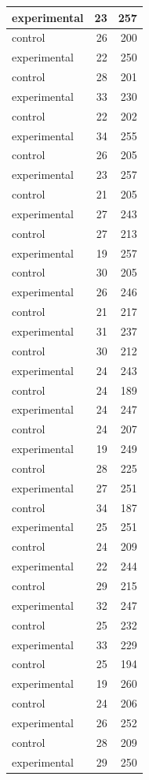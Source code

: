 \documentclass[]{svmono}
\begin{document}
\begin{tabular}{l|r|r}
\hline
experimental & 23 & 257\\
\hline
control & 26 & 200\\
\hline
experimental & 22 & 250\\
\hline
control & 28 & 201\\
\hline
experimental & 33 & 230\\
\hline
control & 22 & 202\\
\hline
experimental & 34 & 255\\
\hline
control & 26 & 205\\
\hline
experimental & 23 & 257\\
\hline
control & 21 & 205\\
\hline
experimental & 27 & 243\\
\hline
control & 27 & 213\\
\hline
experimental & 19 & 257\\
\hline
control & 30 & 205\\
\hline
experimental & 26 & 246\\
\hline
control & 21 & 217\\
\hline
experimental & 31 & 237\\
\hline
control & 30 & 212\\
\hline
experimental & 24 & 243\\
\hline
control & 24 & 189\\
\hline
experimental & 24 & 247\\
\hline
control & 24 & 207\\
\hline
experimental & 19 & 249\\
\hline
control & 28 & 225\\
\hline
experimental & 27 & 251\\
\hline
control & 34 & 187\\
\hline
experimental & 25 & 251\\
\hline
control & 24 & 209\\
\hline
experimental & 22 & 244\\
\hline
control & 29 & 215\\
\hline
experimental & 32 & 247\\
\hline
control & 25 & 232\\
\hline
experimental & 33 & 229\\
\hline
control & 25 & 194\\
\hline
experimental & 19 & 260\\
\hline
control & 24 & 206\\
\hline
experimental & 26 & 252\\
\hline
control & 28 & 209\\
\hline
experimental & 29 & 250\\
\hline
\end{tabular}
\end{document}
